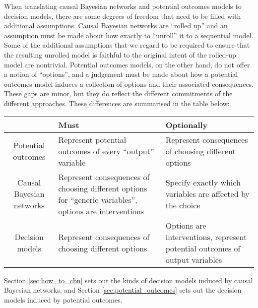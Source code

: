 When translating causal Bayesian networks and potential outcomes models to decision models, there are some degrees of freedom that need to be filled with additional assumptions. Causal Bayesian networks are ``rolled up'' and an assumption must be made about how exactly to ``unroll'' it to a sequential model. Some of the additional assumptions that we regard to be required to ensure that the resulting unrolled model is faithful to the original intent of the rolled-up model are nontrivial. Potential outcomes models, on the other hand, do not offer a notion of ``options'', and a judgement must be made about how a potential outcomes model induces a collection of options and their associated consequences. These gaps are minor, but they do reflect the different commitments of the different approaches. These differences are summarised in the table below:
\begin{center}
\begin{tabular}{ |c|p{5cm}|p{5cm}| } 
 \hline
  & Must & Optionally  \\
 \hline
 Potential outcomes & Represent potential outcomes of every ``output'' variable & Represent consequences of choosing different options \\ 
 Causal Bayesian networks & Represent consequences of choosing different options for ``generic variables'', options are interventions & Specify exactly which variables are affected by the choice \\
 Decision models & Represent consequences of choosing different options & Options are interventions, represent potential outcomes of output variables\\
 \hline
\end{tabular}
\end{center}
Section \ref{sec:how_to_cbn} sets out the kinds of decision models induced by causal Bayesian networks, and Section \ref{sec:potential_outcomes} sets out the decision models induced by potential outcomes.

